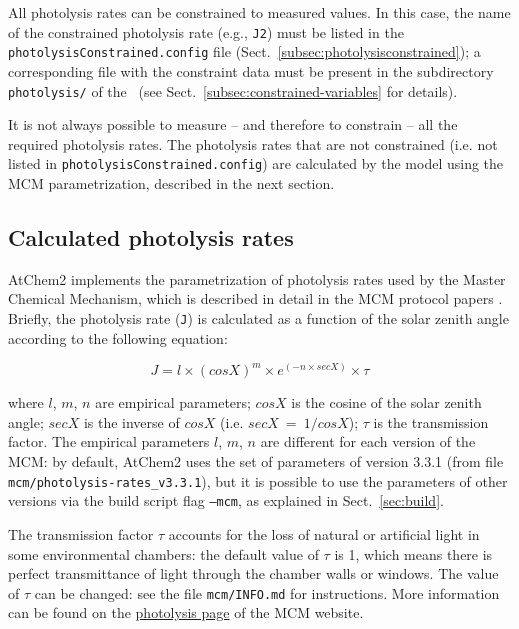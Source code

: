 All photolysis rates can be constrained to measured values. In this case, the name of the
constrained photolysis rate (e.g., \texttt{J2}) must be listed in the
\texttt{photolysisConstrained.config} file (Sect.~\ref{subsec:photolysisconstrained}); a
corresponding file with the constraint data must be present in the subdirectory
\texttt{photolysis/} of the \constrdir\ (see Sect.~\ref{subsec:constrained-variables} for
details).

It is not always possible to measure -- and therefore to constrain -- all the required
photolysis rates. The photolysis rates that are not constrained (i.e. not listed in
\texttt{photolysisConstrained.config}) are calculated by the model using the MCM
parametrization, described in the next section.

\subsection{Calculated photolysis rates} \label{subsec:calculated-photolysis-rates}

AtChem2 implements the parametrization of photolysis rates used by the Master Chemical
Mechanism, which is described in detail in the MCM protocol papers \citep{jenkin_1997,
  saunders_2003}. Briefly, the photolysis rate (\texttt{J}) is calculated as a function of the
solar zenith angle according to the following equation:

\begin{equation}
  J = l \times (cosX)^m \times e^{(-n \times secX)} \times \tau
\end{equation}

where $l$, $m$, $n$ are empirical parameters; $cosX$ is the cosine of the solar zenith angle;
$secX$ is the inverse of $cosX$ (i.e. $secX\ =\ 1/cosX$); $\tau$ is the transmission
factor. The empirical parameters $l$, $m$, $n$ are different for each version of the MCM: by
default, AtChem2 uses the set of parameters of version 3.3.1 (from file
\texttt{mcm/photolysis-rates\_v3.3.1}), but it is possible to use the parameters of other
versions via the build script flag \texttt{--mcm}, as explained in Sect.~\ref{sec:build}.

The transmission factor $\tau$ accounts for the loss of natural or artificial light in some
environmental chambers: the default value of $\tau$ is 1, which means there is perfect
transmittance of light through the chamber walls or windows. The value of $\tau$ can be
changed: see the file \texttt{mcm/INFO.md} for instructions. More information can be found on
the \href{https://mcm.york.ac.uk/MCM/rates/photolysis}{photolysis page} of the MCM website.

